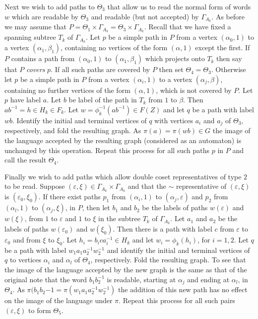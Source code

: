 \documentclass[a4paper,12pt]{article}
\renewcommand{\a}{\alpha }
\renewcommand{\b}{\beta }
\newcommand{\G}{\Gamma }
\newcommand{\e}{\varepsilon }
\newcommand{\T}{\Theta }
\numberwithin{equation}{section}
\numberwithin{figure}{section}
\begin{document}
Next we wish to add paths to $\T_3$ that allow us to read the normal
form of words $w$ which are readable by $\T_3$ and readable 
(but not accepted) by $\G_{A_k}$.  
As before we may assume that
$P=\T_1\times \G_{A_k}=
 \T_3\times \G_{A_k}$. 
Recall that we have fixed a spanning subtree 
$T_k$ of $\G_{A_k}$. Let $p$ be a simple path in $P$ from a 
vertex $(\a_0,1)$ to a vertex $(\a_1,\b_1)$, containing no
vertices of the form $(\a,1)$ except the first. If $P$ contains a 
path from $(\a_0,1)$ to $(\a_1,\b_1)$ which projects onto $T_k$ then
 say that $P$ {\em covers} $p$. 
If all such paths are covered by $P$ then set $\T_4=\T_3$.
Otherwise 
let $p$ be a simple path in $P$ from a  vertex $(\a_i,1)$ to a vertex $(\a_j,\b)$, containing no further
vertices of the form $(\a,1)$,
which is not covered by $P$.
 Let 
$p$ have label $a$.  
Let $b$ be label of the path in $T_k$ from $1$ to $\b$. 
Then $ab^{-1}=h\in H_k\in F_k$. Let 
$w=\phi_{k}^{-1}(ab^{-1})
\in F(Z)$ and let $q$ be a path with label $wb$. Identify the initial
and terminal vertices of $q$ with vertices $a_i$ and $a_j$ of $\T_3$, 
respectively, and fold
the resulting graph. 
As $\pi(a)=\pi(wb)\in G$ the image of the language accepted by
the resulting graph (considered as an automaton) is unchanged by
this operation. 
Repeat this process for all such paths $p$ in $P$ and 
call the result $\T_4$. 

Finally we wish to add paths which allow double coset representatives
of type $2$ to be read. Suppose $(\e,\xi)\in \G_{A_k}\times \G_{A_k}$ and
that the $\sim$ representative of $(\e,\xi)$ is $(\e_0,\xi_0)$. If there
exist paths $p_1$ from $(\a_i,1)$ to $(\a_j,\e)$ and $p_2$ from
$(\a_l,1)$ to $(\a_j,\xi)$, in $P$,  then let $b_1$ and $b_2$ be the labels
of paths $w(\e)$ and $w(\xi)$, from $1$ to $\e$ and $1$ to $\xi$ in the
subtree $T_k$ of $\G_{A_k}$. Let $a_1$ and $a_2$ be the labels of 
paths $w(\e_0)$ and $w(\xi_0)$. Then there is a path with label 
$c$ from $\e$ to $\e_0$ and from $\xi$ to $\xi_0$. Let $h_i=
b_ica_i^{-1}\in H_k$ and let $w_i=\phi_k(h_i)$, for $i=1,2$. 
Let $q$ be a path with label $w_1 a_1a_2^{-1} w_2^{-1}$ 
and identify the initial
and terminal vertices of $q$ to  vertices $\a_i$ and $\a_l$
of $\T_4$, respectively. 
Fold the resulting graph. 
To see that the image of the language accepted by
 the new graph is the same as that of the original note
that the word $b_1b_2^{-1}$ is readable, starting at $\a_j$ and 
ending at $\a_l$, in $\T_4$. As $\pi(b_1b_2{-1}=\pi(w_1a_1a_2^{-1}w_2^{-1})$
the addition of this new path has no effect on the image of the language 
under $\pi$.  
Repeat this process for all such 
pairs $(\e,\xi)$ to form $\T_5$.    
\end{document}
